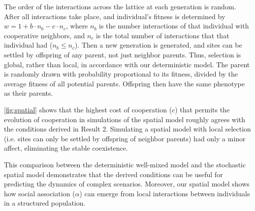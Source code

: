 \documentclass[12pt]{extarticle}
\begin{document}
{The order of the interactions across the lattice at each generation is random.
After all interactions take place, and individual's fitness is determined by
$w = 1 + b \cdot n_b - c \cdot n_c$,
where $n_b$ is the number interactions of that individual with cooperative neighbors, and $n_c$ is the total number of interactions that that individual  had ($n_b \le n_c$).
Then a new generation is generated, and sites can be settled by offspring of any parent, not just neighbor parents. Thus, selection is global, rather than local, in accordance with our deterministic model.
The parent is randomly drawn with probability proportional to its fitness, divided by the average fitness of all potential parents.
Offspring then have the same phenotype as their parents.

\autoref{fig:spatial} shows that the highest cost of cooperation ($c$) that permits the evolution of cooperation in simulations of the spatial model roughly agrees with the conditions derived in Result 2.
Simulating a spatial model with local selection (i.e. sites can only be settled by offspring of neighbor parents) had only a minor affect, eliminating the stable coexistence. 

This comparison between the deterministic well-mixed model and the stochastic spatial model demonstrates that the derived conditions can be useful for predicting the dynamics of complex scenarios. 
Moreover, our spatial model shows how social association ($\alpha$) can emerge from local interactions between individuals in a structured population.


}
\end{document}
